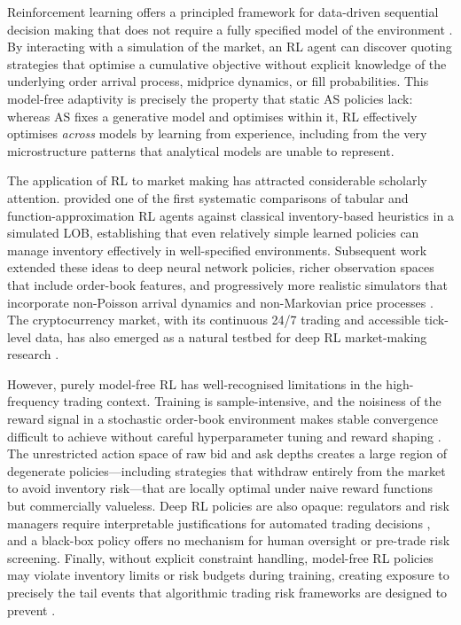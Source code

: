 \documentclass[11pt]{article}
\begin{document}
Reinforcement learning offers a principled framework for data-driven
sequential decision making that does not require a fully specified model
of the environment \parencite{schulman2017ppo}.
By interacting with a simulation of the market, an RL agent can discover
quoting strategies that optimise a cumulative objective without explicit
knowledge of the underlying order arrival process, midprice dynamics,
or fill probabilities.
This model-free adaptivity is precisely the property that static AS
policies lack: whereas AS fixes a generative model and optimises within
it, RL effectively optimises \emph{across} models by learning from
experience, including from the very microstructure patterns that
analytical models are unable to represent.

The application of RL to market making has attracted considerable
scholarly attention.
\textcite{spooner2018mmrl} provided one of the first systematic
comparisons of tabular and function-approximation RL agents against
classical inventory-based heuristics in a simulated LOB, establishing
that even relatively simple learned policies can manage inventory
effectively in well-specified environments.
Subsequent work extended these ideas to deep neural network policies,
richer observation spaces that include order-book features, and
progressively more realistic simulators that incorporate non-Poisson
arrival dynamics \parencite{gasperov2021rlmm,gasperov2022hawkesmm}
and non-Markovian price processes \parencite{lalor2025nonmarkov}.
The cryptocurrency market, with its continuous 24/7 trading and
accessible tick-level data, has also emerged as a natural testbed for
deep RL market-making research \parencite{sadighian2019crypto}.

However, purely model-free RL has well-recognised limitations in the
high-frequency trading context.
Training is sample-intensive, and the noisiness of the reward signal in
a stochastic order-book environment makes stable convergence difficult
to achieve without careful hyperparameter tuning and reward shaping
\parencite{gasperov2021rlmm}.
The unrestricted action space of raw bid and ask depths creates a large
region of degenerate policies---including strategies that withdraw
entirely from the market to avoid inventory risk---that are locally
optimal under naive reward functions but commercially valueless.
Deep RL policies are also opaque: regulators and risk managers require
interpretable justifications for automated trading decisions
\parencite{menkveld2013high}, and a black-box policy offers no mechanism
for human oversight or pre-trade risk screening.
Finally, without explicit constraint handling, model-free RL policies
may violate inventory limits or risk budgets during training,
creating exposure to precisely the tail events that algorithmic trading
risk frameworks are designed to prevent \parencite{cartea2015execution}.
\end{document}
